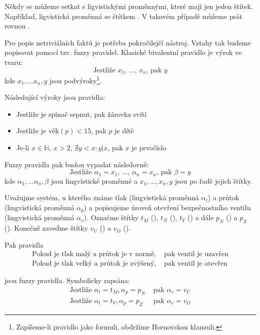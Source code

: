 \begin{note}
 Někdy se můžeme setkat s ligvistickými proměnnými, které mají jen jeden štítek. Například, ligvistická proměnná  se štítkem . V takovém případě můžeme psát rovnou .
\end{note}

Pro popis netriviálních faktů je potřeba pokročilejčí nástroj. Vztahy tak budeme popisovat pomocí tzv. fuzzy \ifthen pravidel\cite{Jan-FouFuzzContPracAppr}. Klasické bivalentní \ifthen pravidlo je výrok ve tvaru:
$$
 \text{Jestliže $x_1$, $\dots$, $x_n$, pak $y$}
$$
kde $x_1, \dots x_n, y$ jsou podvýroky\footnote{Zapíšeme-li \ifthen pravidlo jako formuli, obdržíme Hornovskou klauzuli.}.

\begin{example}
 Následující výroky jsou \ifthen pravidla:
 \begin{itemize}
  \item Jestliže je spínač sepnut, pak žárovka svítí
  \item Jestliže je $\text{věk}(p) < 15$, pak $p$ je dítě
  \item Je-li $x \in \mathbb{N}$, $x > 2$, $\nexists y < x: y|x$, pak $x$ je prvočíslo
 \end{itemize}
\end{example}

Fuzzy \ifthen pravidla pak budou vypadat následovně:
$$
 \text{Jestliže $\alpha_1 = x_1$, $\dots$, $\alpha_n = x_n$, pak $\beta = y$}
$$
kde $\alpha_1, \dots \alpha_n, \beta$ jsou lingvistické proměnné a $x_1, \dots, x_n, y$ jsou po řadě jejich štítky.


\begin{example}
 Uvažujme systém, u kterého známe tlak (lingvistická proměnná $\alpha_t$) a průtok (lingvistická proměnná $\alpha_p$) a popisujeme úroveň otevření bezpečnostního ventilu (lingvistická proměnná $\alpha_v$). 
 Označme štítky $t_M$ (), $t_N$ (), $t_V$ () a dále $p_N$ () a $p_Z$ (). Konečně zaveďme štítky $v_U$ () a $v_O$ (). 
 
 Pak pravidla
 \begin{align*}
  \text{Pokud je tlak malý a průtok je v normě, }&\text{pak ventil je uzavřen} \\
  \text{Pokud je tlak velký a průtok je zvýšený, }&\text{pak ventil je otevřen}
 \end{align*}

 jsou fuzzy \ifthen pravidla. Symbolicky zapsána:
 \begin{align*}
  \text{Jestliže } \alpha_t = t_M, \alpha_p = p_N &\text{ pak } \alpha_v = v_U \\
  \text{Jestliže } \alpha_t = t_V, \alpha_p = p_Z &\text{ pak } \alpha_v = v_O 
 \end{align*}
\end{example}



